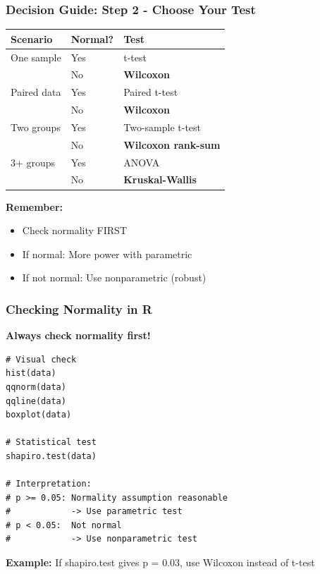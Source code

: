 \documentclass{beamer}
\begin{document}
\begin{frame}
\frametitle{Decision Guide: Step 2 - Choose Your Test}

\begin{center}
\begin{tabular}{lll}
\toprule
\textbf{Scenario} & \textbf{Normal?} & \textbf{Test} \\
\midrule
One sample & Yes & t-test \\
 & No & \textbf{Wilcoxon} \\
\midrule
Paired data & Yes & Paired t-test \\
 & No & \textbf{Wilcoxon} \\
\midrule
Two groups & Yes & Two-sample t-test \\
 & No & \textbf{Wilcoxon rank-sum} \\
\midrule
3+ groups & Yes & ANOVA \\
 & No & \textbf{Kruskal-Wallis} \\
\bottomrule
\end{tabular}
\end{center}

\vspace{0.5cm}
\textbf{Remember:}
\begin{itemize}
\item Check normality FIRST
\item If normal: More power with parametric
\item If not normal: Use nonparametric (robust)
\end{itemize}
\end{frame}

\begin{frame}[fragile]
\frametitle{Checking Normality in R}
\textbf{Always check normality first!}

\vspace{0.3cm}
\begin{small}
\begin{verbatim}
# Visual check
hist(data)
qqnorm(data)
qqline(data)
boxplot(data)

# Statistical test
shapiro.test(data)

# Interpretation:
# p >= 0.05: Normality assumption reasonable
#            -> Use parametric test
# p < 0.05:  Not normal
#            -> Use nonparametric test
\end{verbatim}
\end{small}

\textbf{Example:} If shapiro.test gives p = 0.03, use Wilcoxon instead of t-test
\end{frame}
\end{document}
